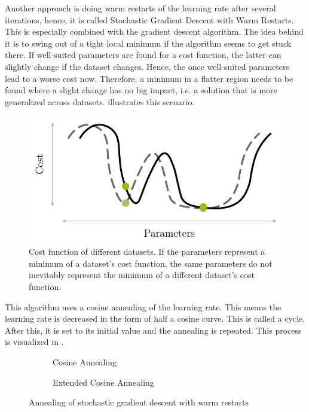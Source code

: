 Another approach is doing warm restarts of the learning rate after several iterations, hence, it is called Stochastic Gradient Descent with Warm Restarts\cite{DBLP:journals/corr/LoshchilovH16a}.
This is especially combined with the gradient descent algorithm.
The idea behind it is to swing out of a tight local minimum if the algorithm seems to get stuck there.
If well-suited parameters are found for a cost function, the latter can slightly change if the dataset changes.
Hence, the once well-suited parameters lead to a worse cost now.
Therefore, a minimum in a flatter region needs to be found where a slight change has no big impact, i.e. a solution that is more generalized across datasets.
 illustrates this scenario.
\begin{figure}
	\centering
	\includegraphics[]{images/sgdr-cost.pdf}
	\caption[Cost function of different datasets]{Cost function of different datasets. If the parameters represent a minimum of a dataset's cost function, the same parameters do not inevitably represent the minimum of a different dataset's cost function.}
	\label{fig:sgdr-cost}
\end{figure}
This algorithm uses a cosine annealing of the learning rate.
This means the learning rate is decreased in the form of half a cosine curve.
This is called a cycle.
After this, it is set to its initial value and the annealing is repeated.
This process is visualized in .
\begin{figure}
	\setlength{}
	\setlength{}
	\centering
	\begin{subfigure}{.49\textwidth}
		\centering
		
		\caption{Cosine Annealing}
		\label{fig:sgdr-annealing-normal}
	\end{subfigure}%
	\setlength{}
	\begin{subfigure}{.49\textwidth}
		\centering
		
		\caption{Extended Cosine Annealing}
		\label{fig:sgdr-annealing-extended}
	\end{subfigure}
	\caption{Annealing of stochastic gradient descent with warm restarts}
	\label{fig:sgdr-annealing}
\end{figure}
